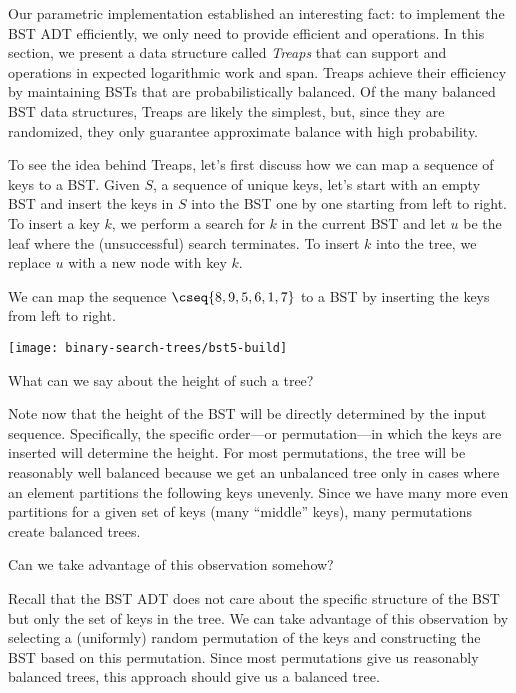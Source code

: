 \begin{chapter}
Our parametric implementation established an interesting fact: to
implement the BST ADT efficiently, we only need to provide efficient
 and  operations.  In this section, we
present a data structure called {\em Treaps} that can support
 and  operations in expected logarithmic work
and span.
%
Treaps achieve their efficiency by maintaining BSTs that are
probabilistically balanced. Of the many balanced BST data structures,
Treaps are likely the simplest, but, since they are randomized, they
only guarantee approximate balance with high probability.

\begin{notesonly}

  To see the idea behind Treaps, let's first discuss how we can map a
  sequence of keys to a BST. Given $S$, a sequence of unique keys,
  let's start with an empty BST and insert the keys in $S$ into the
  BST one by one starting from left to right.  To insert a key $k$, we
  perform a search for $k$ in the current BST and let $u$ be the leaf
  where the (unsuccessful) search terminates.  To insert $k$ into the
  tree, we replace $u$ with a new node with key $k$.

\begin{simpleexample}

We can map the sequence $\cseq{8,9,5,6,1,7}$ to a BST by inserting the keys from
left to right.

\begin{center}
\texttt{[image: binary-search-trees/bst5-build]}
\end{center}

\end{simpleexample}

\begin{question}
What can we say about the height of such a tree? 
\end{question}
Note now that the height of the BST will be directly determined by the
input sequence.  Specifically, the specific order---or
permutation---in which the keys are inserted will determine the
height.  For most permutations, the tree will be reasonably well
balanced because we get an unbalanced tree only in cases where an
element partitions the following keys unevenly.  Since we have
many more even partitions for a given set of keys (many ``middle''
keys), many permutations create balanced trees.

\begin{question}
Can we take advantage of this observation somehow? 
\end{question}
%
Recall that the BST ADT does not care about the specific structure of
the BST but only the set of keys in the tree. We can take advantage of
this observation by selecting a (uniformly) random permutation of the keys and
constructing the BST based on this permutation.  Since most
permutations give us reasonably balanced trees, this approach should
give us a balanced tree.



\end{notesonly}
\end{chapter}
